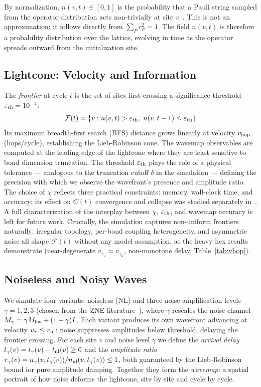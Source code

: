 \documentclass[letterpaper]{article}
\begin{document}
By normalization, $n(v,t) \in [0,1]$ is the probability that a Pauli
string sampled from the operator distribution acts non-trivially at
site $v$~\cite{nahum2018operator,Tan2025Operator}.
This is not an approximation: it follows directly from $\sum_P c_P^2=1$.
The field $n(v,t)$ is therefore a probability distribution over the
lattice, evolving in time as the operator spreads outward from the
initialization site.

\subsection{Lightcone: Velocity and Information}

The \emph{frontier} at cycle $t$ is the set of sites first crossing a
significance threshold $\varepsilon_{\rm th} = 10^{-4}$:
\begin{equation}
    \mathcal{F}(t) = \{v : n(v,t) > \varepsilon_{\rm th},\;
                          n(v,t-1) \leq \varepsilon_{\rm th}\}
\end{equation}
Its maximum breadth-first search (BFS) distance grows linearly at
velocity $v_{\rm hop}$ (hops/cycle), establishing the Lieb-Robinson
cone.
The wavemap observables are computed at the leading edge of the
lightcone where they are least sensitive to bond dimension truncation.
The threshold $\varepsilon_{\rm th}$ plays the role of a physical
tolerance — analogous to the truncation cutoff $\delta$ in the
simulation — defining the precision with which we observe the
wavefront's presence and amplitude ratio.
The choice of $\chi$ reflects three practical constraints: memory,
wall-clock time, and accuracy; its effect on $C(t)$ convergence
and collapse was studied separately in~\cite{dalberto2026ising}.
A full characterization of the interplay between $\chi$,
$\varepsilon_{\rm th}$, and wavemap accuracy is left for future work.
Crucially, the simulation captures non-uniform frontiers naturally:
irregular topology, per-bond coupling heterogeneity, and asymmetric
noise all shape $\mathcal{F}(t)$ without any model assumption, as
the heavy-hex results demonstrate (near-degenerate $v_{\gamma_2}
\approx v_{\gamma_3}$, non-monotone delay, Table~\ref{tab:vhop}).

\subsection{Noiseless and Noisy Waves}

We simulate four variants: noiseless (NL) and three noise amplification
levels $\gamma=1,2,3$ (chosen from the ZNE literature~\cite{giurgica2020digital}),
where $\gamma$ rescales the noise channel $M_\gamma = \gamma M_{\rm hw} + (1-\gamma)I$.
Each variant produces its own wavefront advancing at velocity
$v_{\gamma} \leq v_{\rm nl}$: noise suppresses amplitudes below
threshold, delaying the frontier crossing.
For each site $v$ and noise level $\gamma$ we define the
\emph{arrival delay} $l_\gamma(v) = t_\gamma(v) - t_{\rm nl}(v) \geq 0$
and the \emph{amplitude ratio}
$r_\gamma(v) = n_\gamma(v,t_\gamma(v))/n_{\rm nl}(v,t_\gamma(v)) \leq 1$,
both guaranteed by the Lieb-Robinson bound for pure amplitude damping.
Together they form the \emph{wavemap}: a spatial portrait of how noise
deforms the lightcone, site by site and cycle by cycle.
\end{document}
